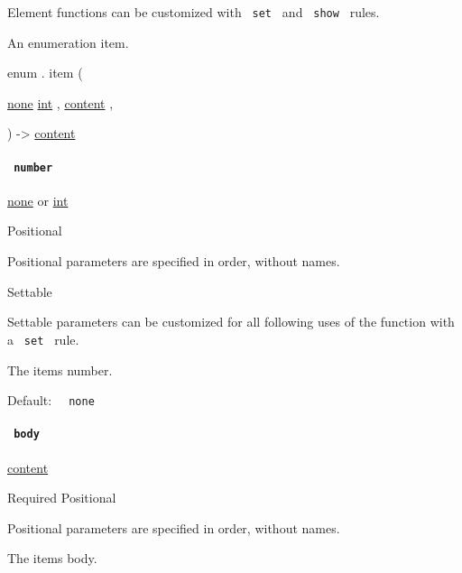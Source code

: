 \label{definitions-item-element-tooltip}
Element functions can be customized with \texttt{\ set\ } and
\texttt{\ show\ } rules.

An enumeration item.

enum { . } { item } (

{ \hyperref[definitions-item-parameters-number]{}
\href{/docs/reference/foundations/none/}{none}
\href{/docs/reference/foundations/int/}{int} , } {
\href{/docs/reference/foundations/content/}{content} , }

) -\textgreater{} \href{/docs/reference/foundations/content/}{content}

\paragraph{\texorpdfstring{\texttt{\ number\ }}{ number }}\label{definitions-item-number}

\href{/docs/reference/foundations/none/}{none} {or}
\href{/docs/reference/foundations/int/}{int}

{{ Positional }}

\label{definitions-item-number-positional-tooltip}
Positional parameters are specified in order, without names.

{{ Settable }}

\label{definitions-item-number-settable-tooltip}
Settable parameters can be customized for all following uses of the
function with a \texttt{\ set\ } rule.

The item\textquotesingle s number.

Default: \texttt{\ }{\texttt{\ none\ }}\texttt{\ }

\paragraph{\texorpdfstring{\texttt{\ body\ }}{ body }}\label{definitions-item-body}

\href{/docs/reference/foundations/content/}{content}

{Required} {{ Positional }}

\label{definitions-item-body-positional-tooltip}
Positional parameters are specified in order, without names.

The item\textquotesingle s body.

\href{/docs/reference/model/link/}{\pandocbounded{}}

